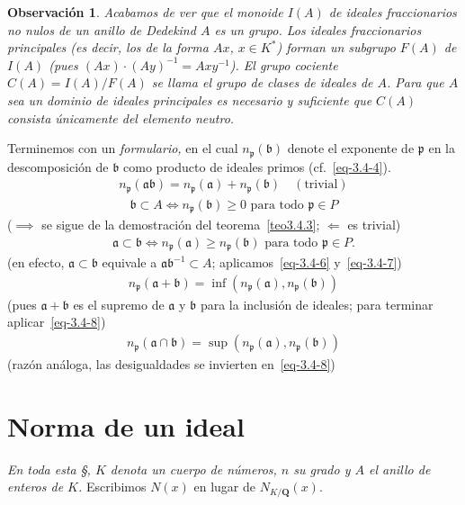 \documentclass[10pt,oneside,bibtotoc,smallheadings,leqno,a5paper,DIV=12]{scrbook}
\newcommand{\QQ}{\mathbf{Q}}
\newcommand{\idl}[1]{\mathfrak{#1}}
\numberwithin{equation}{section}
\theoremstyle{defi}
\theoremstyle{enonce}
\theoremstyle{rem}
\newtheorem*{remark*}{Observaci\'on}
\numberwithin{theorem}{section}
\numberwithin{proposition}{section}
\numberwithin{definition}{section}
\numberwithin{lemma}{section}
\numberwithin{corollary}{section}
\numberwithin{example}{section}
\numberwithin{footnote}{section}%
\begin{document}
\begin{remark*}
Acabamos de ver que el monoide $I(A)$ de ideales fraccionarios no nulos de un anillo de Dedekind $A$
es un grupo. Los ideales fraccionarios {\em principales} (es decir, los de la forma $Ax$, $x\in K^{*}$)
forman un subgrupo $F(A)$ de $I(A)$ (pues $(Ax)\cdot(Ay)^{-1} = Axy^{-1}$). El grupo cociente
$C(A) = I(A)/F(A)$ se llama el {\em grupo de clases de ideales} de $A$. Para que $A$ sea un dominio
de ideales principales es necesario y suficiente que $C(A)$ consista \'unicamente del elemento neutro.
\end{remark*}

Terminemos con un {\em formulario,} en el cual $n_{\idl{p}}(\idl{b})$ denote el exponente de $\idl{p}$
en la descomposici\'on de $\idl{b}$ como producto de ideales primos (cf.~\eqref{eq-3.4-4}).
\begin{gather}\label{eq-3.4-6}
n_{\idl{p}}(\idl{a}\idl{b}) = n_{\idl{p}}(\idl{a})+n_{\idl{p}}(\idl{b})\quad(\text{trivial})
\end{gather}
\begin{gather}\label{eq-3.4-7}
\idl{b}\subset A\iff n_{\idl{p}}(\idl{b})\geq 0\text{ para todo }\idl{p}\in P
\end{gather}
($\implies$ se sigue de la demostraci\'on del teorema~\ref{teo3.4.3}; $\Leftarrow$ es trivial)
\begin{gather}\label{eq-3.4-8}
\idl{a}\subset\idl{b}\iff n_{\idl{p}}(\idl{a})\geq n_{\idl{p}}(\idl{b})\text{ para todo }\idl{p}\in P.
\end{gather}
(en efecto, $\idl{a}\subset\idl{b}$ equivale a $\idl{a}\idl{b}^{-1}\subset A$; aplicamos~\eqref{eq-3.4-6} y~\eqref{eq-3.4-7})
\begin{gather}
n_{\idl{p}}(\idl{a}+\idl{b}) = \inf(n_{\idl{p}}(\idl{a}),n_{\idl{p}}(\idl{b}))
\end{gather}
(pues $\idl{a}+\idl{b}$ es el supremo de $\idl{a}$ y $\idl{b}$ para la inclusi\'on de ideales; para
terminar aplicar~\eqref{eq-3.4-8})
\begin{gather}
n_{\idl{p}}(\idl{a}\cap\idl{b}) = \sup(n_{\idl{p}}(\idl{a}),n_{\idl{p}}(\idl{b}))
\end{gather}
(raz\'on an\'aloga, las desigualdades se invierten en~\eqref{eq-3.4-8})

\section{Norma de un ideal}\label{sec3.5}

\begin{trivlist}\item
{\itshape En toda esta \S, $K$ denota un cuerpo de n\'umeros, $n$ su grado y $A$ el anillo
de enteros de $K$.} Escribimos $N(x)$ en lugar de $N_{K/\QQ}(x)$.
\end{trivlist}
\end{document}
